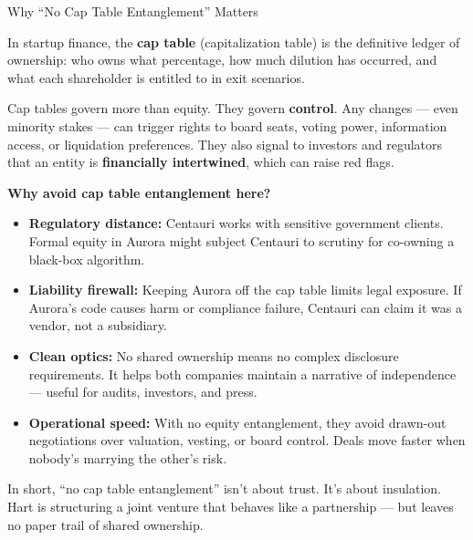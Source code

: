 \begin{TechnicalSidebar}{Why “No Cap Table Entanglement” Matters}

  In startup finance, the \textbf{cap table} (capitalization table) is the definitive ledger of ownership:  
  who owns what percentage, how much dilution has occurred, and what each shareholder is entitled to in exit scenarios.
  
  \medskip
  
  Cap tables govern more than equity. They govern \textbf{control}.  
  Any changes — even minority stakes — can trigger rights to board seats, voting power, information access, or liquidation preferences.  
  They also signal to investors and regulators that an entity is \textbf{financially intertwined}, which can raise red flags.
  
  \medskip
  
  \textbf{Why avoid cap table entanglement here?}

  \medskip
  
  \begin{itemize}
    \item \textbf{Regulatory distance:} Centauri works with sensitive government clients. Formal equity in Aurora 
    might subject Centauri to scrutiny for co-owning a black-box algorithm.
    
    \item \textbf{Liability firewall:} Keeping Aurora off the cap table limits legal exposure. If Aurora’s code 
    causes harm or compliance failure, Centauri can claim it was a vendor, not a subsidiary.
    
    \item \textbf{Clean optics:} No shared ownership means no complex disclosure requirements. It helps both 
    companies maintain a narrative of independence — useful for audits, investors, and press.
  
    \item \textbf{Operational speed:} With no equity entanglement, they avoid drawn-out negotiations over 
    valuation, vesting, or board control. Deals move faster when nobody’s marrying the other’s risk.
  
  \end{itemize}

  \medskip
  
  In short, ``no cap table entanglement'' isn’t about trust. It’s about insulation.  
  Hart is structuring a joint venture that behaves like a partnership — but leaves no paper trail of shared ownership.
  
\end{TechnicalSidebar}

